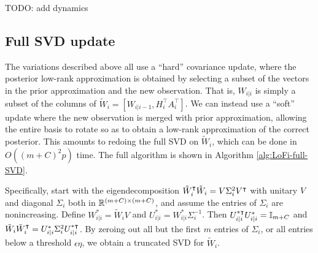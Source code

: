 TODO: add dynamics

\subsection{Full SVD update}

The variations described above all use a ``hard'' covariance update, where the posterior low-rank approximation is obtained by selecting a subset of the vectors in the prior approximation and the new observation. 
That is, $W_{i\vert i}$ is simply a subset of the columns of $\tilde{W}_{i} = [W_{i\vert i-1},H_i^\top A_i^\top]$. 
We can instead use a ``soft'' update where the new observation is merged with prior approximation, allowing the entire basis to rotate so as to obtain a low-rank approximation of the correct posterior. 
This amounts to redoing the full SVD on $\tilde{W}_i$, which can be done in $O((m+C)^2p)$ time. The full algorithm is shown in Algorithm \ref{alg:LoFi-full-SVD}.

Specifically, start with the eigendecomposition $\tilde{W}_i^\intercal\tilde{W}_i = V\Sigma_i^2 V^\intercal$ with unitary $V$ and diagonal $\Sigma_i$ both in ${\mathbb{R}}^{(m+C)\times(m+C)}$, and assume the entries of $\Sigma_i$ are nonincreasing. Define $W^*_{i\vert i} = \tilde{W}_i V$ and $U^*_{i\vert i} = W^*_{i\vert i} \Sigma_i^{-1}$. Then $U^{*\intercal}_{i\vert i}U^{*}_{i\vert i}=\mathbb{I}_{m+C}$ and $\tilde{W}_i\tilde{W}_i^\intercal = U^{*}_{i\vert i}\Sigma_i^2 U^{*\intercal}_{i\vert i}$. By zeroing out all but the first $m$ entries of $\Sigma_i$, or all entries below a threshold $\epsilon\eta$, we obtain a truncated SVD for $\tilde{W}_i$.

